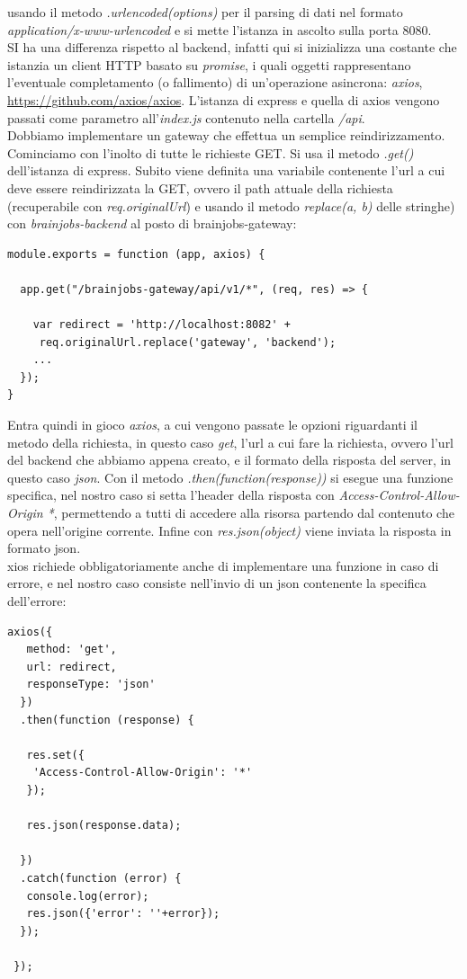 \documentclass[a4paper,12pt, oneside]{book}
\begin{document}
usando il metodo \textit{.urlencoded({options})} per il parsing di dati nel formato
\textit{application/x-www-urlencoded} e si mette l'istanza in ascolto sulla porta 8080.\\
SI ha una differenza rispetto al backend, infatti qui si inizializza una costante che istanzia un client HTTP basato su \textit{promise}, i quali oggetti rappresentano l'eventuale completamento (o fallimento) di un'operazione asincrona: \textit{axios}, \url{https://github.com/axios/axios}. L'istanza di express e quella di axios vengono passati come parametro all'\textit{index.js} contenuto nella cartella \textit{/api}.\\
Dobbiamo implementare un gateway che effettua un semplice reindirizzamento.\\
Cominciamo con l'inolto di tutte le richieste GET. Si usa il metodo \textit{.get()}
dell'istanza di express. Subito viene definita una variabile contenente l'url a cui
deve essere reindirizzata la GET, ovvero il path attuale della richiesta (recuperabile con \textit{req.originalUrl})
e usando il metodo \textit{replace(a, b)} delle stringhe) con \textit{brainjobs-backend} al posto di \textup{brainjobs-gateway}:
\begin{shaded} 
\begin{verbatim}
module.exports = function (app, axios) {

  app.get("/brainjobs-gateway/api/v1/*", (req, res) => {

    var redirect = 'http://localhost:8082' +
     req.originalUrl.replace('gateway', 'backend');
    ...
  });
}
\end{verbatim}
\end{shaded}
Entra quindi in gioco \textit{axios}, a cui vengono passate le opzioni riguardanti il metodo
della richiesta, in questo caso \textit{get}, l'url a cui fare la richiesta, ovvero
l'url del backend che abbiamo appena creato, e il formato della risposta del server,
in questo caso \textit{json}. Con il metodo \textit{.then(function(response))} si
esegue una funzione specifica, nel nostro caso si setta l'header della risposta con
\textit{Access-Control-Allow-Origin *}, permettendo a tutti di accedere alla risorsa
partendo dal contenuto che opera nell'origine corrente. Infine con \textit{res.json(object)} viene inviata la risposta in formato json.\\
xios richiede obbligatoriamente anche di implementare una funzione in caso di errore,
e nel nostro caso consiste nell'invio di un json contenente la specifica dell'errore:
\begin{shaded} 
\begin{verbatim}
axios({
   method: 'get',
   url: redirect,
   responseType: 'json'
  })
  .then(function (response) {
  
   res.set({
    'Access-Control-Allow-Origin': '*'                
   });
  
   res.json(response.data);

  })
  .catch(function (error) {
   console.log(error);
   res.json({'error': ''+error});
  });       
  
 });

\end{verbatim}
\end{shaded}
\end{document}
